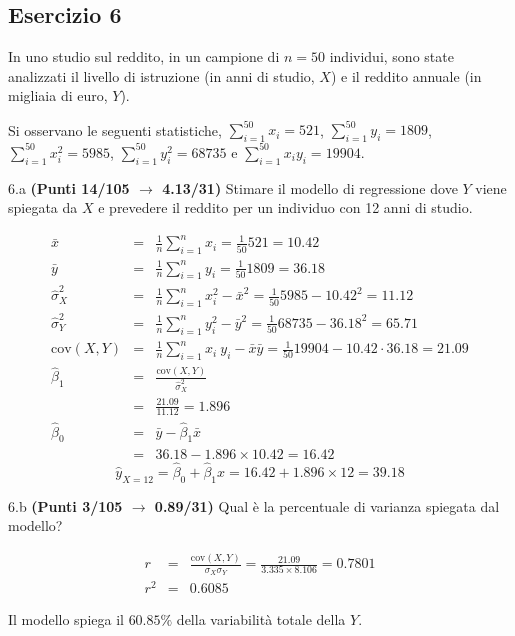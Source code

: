 \documentclass[
  11pt,
]{book}
\theoremstyle{mytheoremstyle}
\theoremstyle{mydefstyle}
\newenvironment{sol}
  {
  \begin{tcolorbox}[enhanced,breakable,arc=0.1mm,boxrule=1pt,colback=white,colframe=iblue,
  title=\bf \fontfamily{lmss}\selectfont \hspace{.5 cm} Soluzione,drop fuzzy shadow]

}{
\end{tcolorbox}
  }
\begin{document}
\subsection{Esercizio 6}\label{esercizio-6-28}

In uno studio sul reddito, in un campione di \(n=50\) individui, sono state analizzati il livello di istruzione (in anni di studio, \(X\)) e il reddito annuale (in migliaia di euro, \(Y\)).

Si osservano le seguenti statistiche, \(\sum_{i=1}^{50}x_i=521\), \(\sum_{i=1}^{50}y_i=1809\),
\(\sum_{i=1}^{50}x_i^2=5985\), \(\sum_{i=1}^{50}y_i^2=68735\) e \(\sum_{i=1}^{50}x_iy_i=19904\).

6.a \textbf{(Punti 14/105 \(\rightarrow\) 4.13/31)} Stimare il modello di regressione dove \(Y\) viene spiegata da \(X\) e prevedere il reddito per un individuo con 12 anni di studio.

\begin{sol}
\begin{eqnarray*}
           \bar x &=&\frac 1 n\sum_{i=1}^n x_i = \frac {1}{ 50 }  521 =  10.42 \\
           \bar y &=&\frac 1 n\sum_{i=1}^n y_i = \frac {1}{ 50 }  1809 =  36.18 \\
           \hat\sigma_X^2&=&\frac 1 n\sum_{i=1}^n x_i^2-\bar x^2=\frac {1}{ 50 }  5985  - 10.42 ^2= 11.12 \\
           \hat\sigma_Y^2&=&\frac 1 n\sum_{i=1}^n y_i^2-\bar y^2=\frac {1}{ 50 }  68735  - 36.18 ^2= 65.71 \\
           \text{cov}(X,Y)&=&\frac 1 n\sum_{i=1}^n x_i~y_i-\bar x\bar y=\frac {1}{ 50 }  19904 - 10.42 \cdot 36.18 = 21.09 \\
           \hat\beta_1 &=& \frac{\text{cov}(X,Y)}{\hat\sigma_X^2} \\
                    &=& \frac{ 21.09 }{ 11.12 }  =  1.896 \\
           \hat\beta_0 &=& \bar y - \hat\beta_1 \bar x\\
                    &=&  36.18 - 1.896 \times  10.42 = 16.42 
         \end{eqnarray*}\[\hat y_{X= 12 }=\hat\beta_0+\hat\beta_1 x= 16.42 + 1.896 \times 12 = 39.18 \]

\end{sol}

6.b \textbf{(Punti 3/105 \(\rightarrow\) 0.89/31)} Qual è la percentuale di varianza spiegata dal modello?

\begin{sol}
\begin{eqnarray*}
r&=&\frac{\text{cov}(X,Y)}{\sigma_X\sigma_Y}=\frac{ 21.09 }{ 3.335 \times 8.106 }= 0.7801 \\ 
r^2&=& 0.6085\end{eqnarray*}

Il modello spiega il \(60.85\%\) della variabilità totale della \(Y\).

\end{sol}
\end{document}
